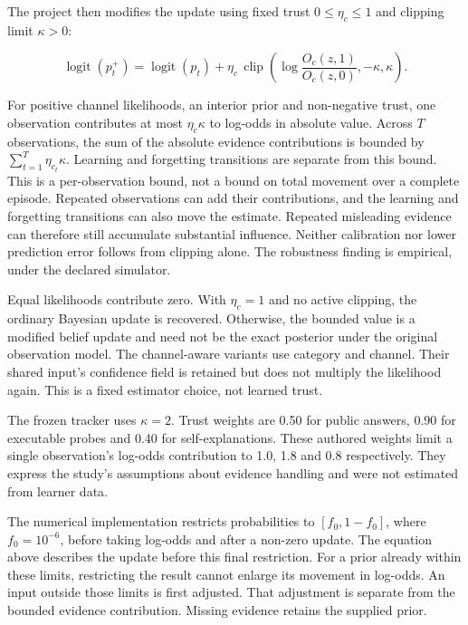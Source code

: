 The project then modifies the update using fixed trust $0\leq\eta_c\leq1$ and clipping limit $\kappa>0$:

\begin{equation}
  \operatorname{logit}(p_t^+)=\operatorname{logit}(p_t)+
  \eta_c\,\operatorname{clip}\!\left(
    \log\frac{O_c(z,1)}{O_c(z,0)},-\kappa,\kappa
  \right).
\end{equation}

For positive channel likelihoods, an interior prior and non-negative trust, one observation contributes at most $\eta_c\kappa$
to log-odds in absolute value. Across $T$ observations, the sum of the absolute evidence contributions is bounded by
$\sum_{t=1}^{T}\eta_{c_t}\kappa$. Learning and forgetting transitions are separate from this bound.
This is a per-observation bound, not a bound on total movement over a complete episode. Repeated observations can add their
contributions, and the learning and forgetting transitions can also move the estimate. Repeated misleading evidence can
therefore still accumulate substantial influence. Neither calibration nor lower prediction error follows from clipping alone.
The robustness finding is empirical, under the declared simulator.

Equal likelihoods contribute zero. With $\eta_c=1$ and no active clipping, the ordinary Bayesian update is recovered. Otherwise,
the bounded value is a modified belief update and need not be the exact posterior under the original observation model.
The channel-aware variants use category and channel. Their shared input's confidence field is retained but does not multiply
the likelihood again. This is a fixed estimator choice, not learned trust.

The frozen tracker uses $\kappa=2$. Trust weights are 0.50 for public answers, 0.90 for executable probes and 0.40 for
self-explanations. These authored weights limit a single observation's log-odds contribution to 1.0, 1.8 and 0.8 respectively.
They express the study's assumptions about evidence handling and were not estimated from learner data.

The numerical implementation restricts probabilities to $[f_0,1-f_0]$, where $f_0=10^{-6}$, before taking log-odds and
after a non-zero update. The equation above describes the update before this final restriction. For a prior already within
these limits, restricting the result cannot enlarge its movement in log-odds. An input outside those limits is first adjusted.
That adjustment is separate from the bounded evidence contribution. Missing evidence retains the supplied prior.

